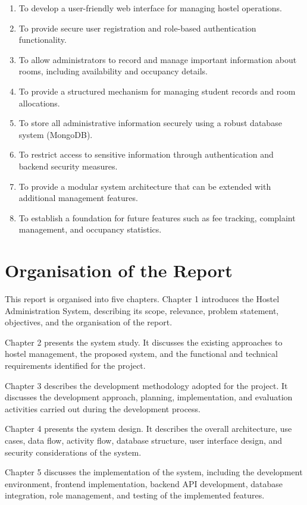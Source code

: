 \begin{enumerate}
    \item To develop a user-friendly web interface for managing hostel operations.

    \item To provide secure user registration and role-based authentication functionality.

    \item To allow administrators to record and manage important information about rooms, including availability and occupancy details.

    \item To provide a structured mechanism for managing student records and room allocations.

    \item To store all administrative information securely using a robust database system (MongoDB).

    \item To restrict access to sensitive information through authentication and backend security measures.

    \item To provide a modular system architecture that can be extended with additional management features.

    \item To establish a foundation for future features such as fee tracking, complaint management, and occupancy statistics.
\end{enumerate}
\newpage
\section{Organisation of the Report}

This report is organised into five chapters. Chapter 1 introduces the Hostel Administration System, describing its scope, relevance, problem statement, objectives, and the organisation of the report.

Chapter 2 presents the system study. It discusses the existing approaches to hostel management, the proposed system, and the functional and technical requirements identified for the project.

Chapter 3 describes the development methodology adopted for the project. It discusses the development approach, planning, implementation, and evaluation activities carried out during the development process.

Chapter 4 presents the system design. It describes the overall architecture, use cases, data flow, activity flow, database structure, user interface design, and security considerations of the system.

Chapter 5 discusses the implementation of the system, including the development environment, frontend implementation, backend API development, database integration, role management, and testing of the implemented features.
